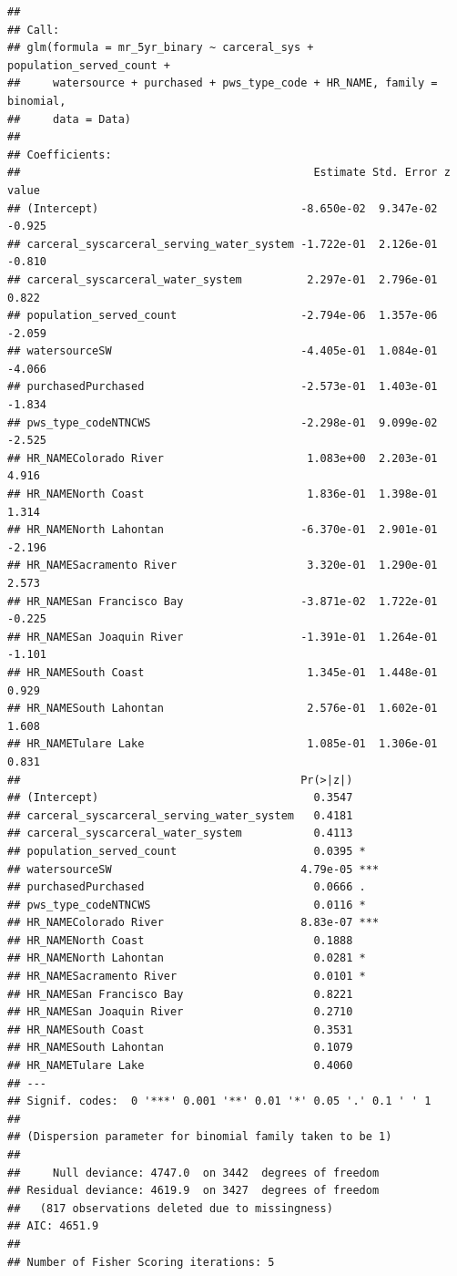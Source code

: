 \documentclass[
]{article}
\begin{document}
\begin{verbatim}
## 
## Call:
## glm(formula = mr_5yr_binary ~ carceral_sys + population_served_count + 
##     watersource + purchased + pws_type_code + HR_NAME, family = binomial, 
##     data = Data)
## 
## Coefficients:
##                                             Estimate Std. Error z value
## (Intercept)                               -8.650e-02  9.347e-02  -0.925
## carceral_syscarceral_serving_water_system -1.722e-01  2.126e-01  -0.810
## carceral_syscarceral_water_system          2.297e-01  2.796e-01   0.822
## population_served_count                   -2.794e-06  1.357e-06  -2.059
## watersourceSW                             -4.405e-01  1.084e-01  -4.066
## purchasedPurchased                        -2.573e-01  1.403e-01  -1.834
## pws_type_codeNTNCWS                       -2.298e-01  9.099e-02  -2.525
## HR_NAMEColorado River                      1.083e+00  2.203e-01   4.916
## HR_NAMENorth Coast                         1.836e-01  1.398e-01   1.314
## HR_NAMENorth Lahontan                     -6.370e-01  2.901e-01  -2.196
## HR_NAMESacramento River                    3.320e-01  1.290e-01   2.573
## HR_NAMESan Francisco Bay                  -3.871e-02  1.722e-01  -0.225
## HR_NAMESan Joaquin River                  -1.391e-01  1.264e-01  -1.101
## HR_NAMESouth Coast                         1.345e-01  1.448e-01   0.929
## HR_NAMESouth Lahontan                      2.576e-01  1.602e-01   1.608
## HR_NAMETulare Lake                         1.085e-01  1.306e-01   0.831
##                                           Pr(>|z|)    
## (Intercept)                                 0.3547    
## carceral_syscarceral_serving_water_system   0.4181    
## carceral_syscarceral_water_system           0.4113    
## population_served_count                     0.0395 *  
## watersourceSW                             4.79e-05 ***
## purchasedPurchased                          0.0666 .  
## pws_type_codeNTNCWS                         0.0116 *  
## HR_NAMEColorado River                     8.83e-07 ***
## HR_NAMENorth Coast                          0.1888    
## HR_NAMENorth Lahontan                       0.0281 *  
## HR_NAMESacramento River                     0.0101 *  
## HR_NAMESan Francisco Bay                    0.8221    
## HR_NAMESan Joaquin River                    0.2710    
## HR_NAMESouth Coast                          0.3531    
## HR_NAMESouth Lahontan                       0.1079    
## HR_NAMETulare Lake                          0.4060    
## ---
## Signif. codes:  0 '***' 0.001 '**' 0.01 '*' 0.05 '.' 0.1 ' ' 1
## 
## (Dispersion parameter for binomial family taken to be 1)
## 
##     Null deviance: 4747.0  on 3442  degrees of freedom
## Residual deviance: 4619.9  on 3427  degrees of freedom
##   (817 observations deleted due to missingness)
## AIC: 4651.9
## 
## Number of Fisher Scoring iterations: 5
\end{verbatim}
\end{document}
